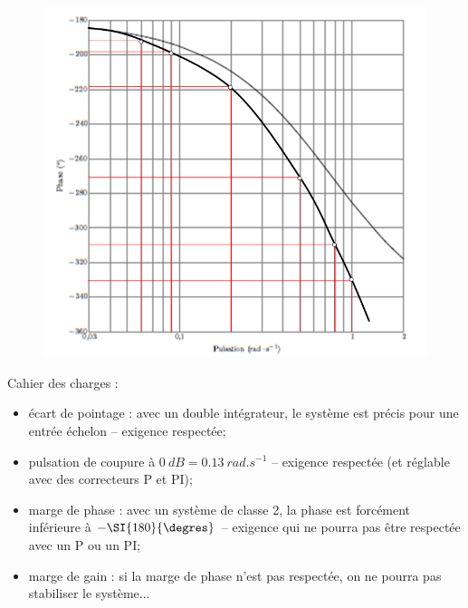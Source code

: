 \begin{corrige}




\begin{figure}[H]
\centering
\includegraphics[width=.6\linewidth]{images/cor_q16_bis}
\end{figure}


Cahier des charges :
\begin{itemize}
\item écart de pointage : avec un double intégrateur, le système est précis pour une entrée échelon -- exigence respectée;
\item pulsation de coupure à $\SI{0}{dB}= \SI{0,13}{rad.s^{-1}}$ -- exigence respectée (et réglable avec des correcteurs P et PI);
\item marge de phase : avec un système de classe 2, la phase est forcément inférieure à $-\SI{180}{\degres}$ -- exigence qui ne pourra pas être respectée avec un P ou un PI;
\item marge de gain : si la marge de phase n'est pas respectée, on ne pourra pas stabiliser le système...
\end{itemize}

\end{corrige}
\else
\fi


